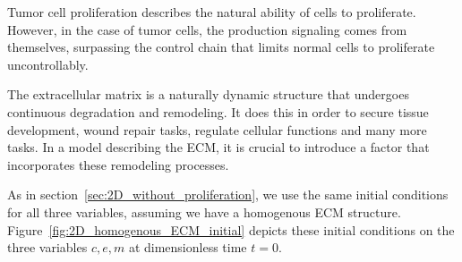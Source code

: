 Tumor cell proliferation describes the natural ability of cells to proliferate. However, in the case of tumor cells, the production signaling comes from themselves, surpassing the control chain that limits normal cells to proliferate uncontrollably.

The extracellular matrix is a naturally dynamic structure that undergoes continuous degradation and remodeling. It does this in order to secure tissue development, wound repair tasks, regulate cellular functions and many more tasks. In a model describing the ECM, it is crucial to introduce a factor that incorporates these remodeling processes.

As in section~\ref{sec:2D_without_proliferation}, we use the same initial conditions for all three variables, assuming we have a homogenous ECM structure. Figure~\ref{fig:2D_homogenous_ECM_initial} depicts these initial conditions on the three variables $c,e,m$ at dimensionless time $t=0$.
